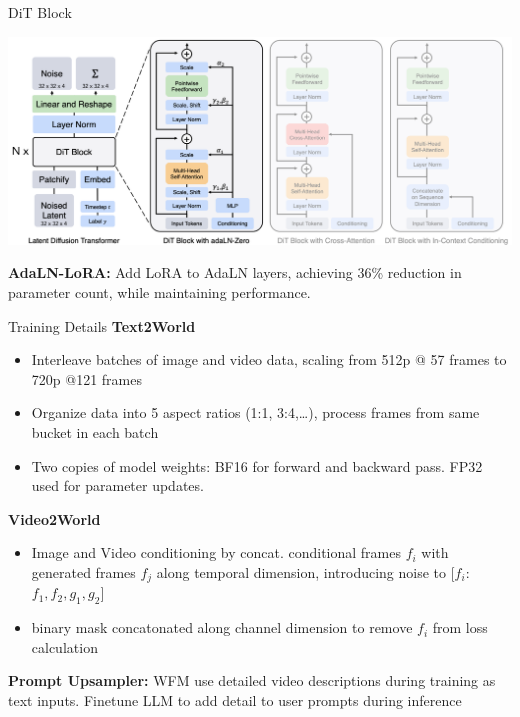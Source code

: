 \documentclass{beamer}
\begin{document}
\begin{frame}{DiT Block}
	\begin{center}
            \includegraphics[width=1.0\textwidth]{./img/diff_arch_final.png}
	\end{center}
    \textbf{AdaLN-LoRA:}\newline
    Add LoRA to AdaLN layers, achieving 36\% reduction in parameter count, while maintaining performance.
\end{frame}

\begin{frame}{Training Details}
    \textbf{Text2World}
    \begin{itemize}[label=-]
        \item Interleave batches of image and video data, scaling from 512p @ 57 frames to 720p @121 frames
        \item Organize data into 5 aspect ratios (1:1, 3:4,\dots), process frames from same bucket in each batch
        \item Two copies of model weights: BF16 for forward and backward pass. FP32 used for parameter updates.
   \end{itemize}
    \textbf{Video2World}
    \begin{itemize}[label=-]
        \item Image and Video conditioning by concat. conditional frames $f_i$ with generated frames $f_j$ along temporal dimension,
        introducing noise to $[f_i$: $f_1, f_2, g_1, g_2]$  
        \item binary mask concatonated along channel dimension to remove $f_i$ from loss calculation
   \end{itemize}
   \textbf{Prompt Upsampler:}\newline
   WFM use detailed video descriptions during training as text inputs. \newline 
   Finetune LLM to add detail to user prompts during inference
\end{frame}
\end{document}
